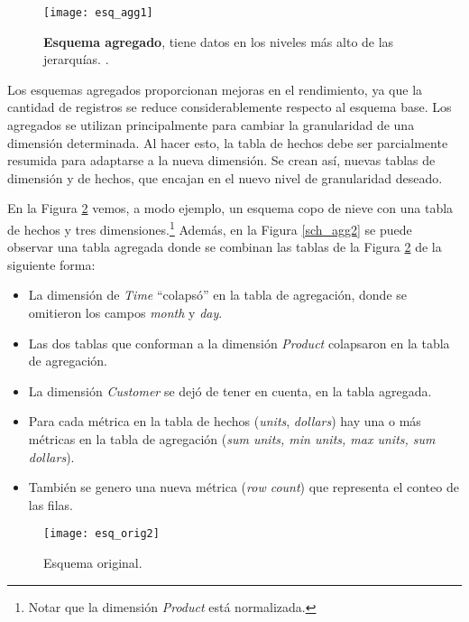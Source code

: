 \documentclass[a4paper,11pt]{article}
\begin{document}
    \begin{figure}
      \begin{center}
        \texttt{[image: esq\_agg1]}
        \caption{\textbf{Esquema agregado}, tiene datos en los niveles más alto de las jerarquías. \cite[p.~172]{nagabhushana}.}
        \label{sch_agg1}
      \end{center}
    \end{figure}
    

    Los esquemas agregados proporcionan mejoras en el rendimiento, ya que la cantidad de registros se reduce considerablemente respecto al esquema base.
    Los agregados se utilizan principalmente para cambiar la granularidad de una dimensión determinada. Al hacer esto, la tabla de hechos debe ser parcialmente
    resumida para adaptarse a la nueva dimensión. Se crean así, nuevas tablas de dimensión y de hechos, que encajan en el nuevo nivel de granularidad deseado.
    
    En la Figura \ref{sch_orig2} vemos, a modo ejemplo, un esquema copo de nieve con una tabla de hechos y tres dimensiones.\footnote{Notar que la
    dimensión \textit{Product} está normalizada.} Además, en la Figura \ref{sch_agg2} se puede observar una tabla agregada donde se combinan las tablas de la
    Figura \ref{sch_orig2} de la siguiente forma:
    
    \begin{itemize}
      \item La dimensión de \textit{Time} ``colapsó'' en la tabla de agregación, donde se omitieron los campos \textit{month} y \textit{day}.
      \item Las dos tablas que conforman a la dimensión \textit{Product} colapsaron en la tabla de agregación.
      \item La dimensión \textit{Customer} se dejó de tener en cuenta, en la tabla agregada.
      \item Para cada métrica en la tabla de hechos (\textit{units}, \textit{dollars}) hay una o más métricas en la tabla de 
      agregación (\textit{sum units, min units, max units, sum dollars}).
      \item También se genero una nueva métrica (\textit{row count}) que representa el conteo de las filas.
    \end{itemize}
    
    \begin{figure}
      \begin{center}
        \texttt{[image: esq\_orig2]}
        \caption{Esquema original. \cite{agg_tables}}
        \label{sch_orig2}
      \end{center}
    \end{figure}
    
\end{document}
